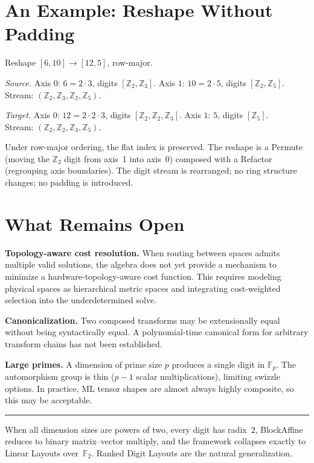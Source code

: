 \documentclass[11pt]{article}
\theoremstyle{definition}
\theoremstyle{remark}
\newcommand{\Z}{\mathbb{Z}}
\newcommand{\F}{\mathbb{F}}
\begin{document}
\section{An Example: Reshape Without Padding}

Reshape $[6, 10] \to [12, 5]$, row-major.

\medskip
\noindent\emph{Source.}\;
Axis $0$: $6 = 2 \cdot 3$, digits $[\Z_2, \Z_3]$.\;
Axis $1$: $10 = 2 \cdot 5$, digits $[\Z_2, \Z_5]$.\\
Stream: $(\Z_2, \Z_3, \Z_2, \Z_5)$.

\medskip
\noindent\emph{Target.}\;
Axis $0$: $12 = 2 \cdot 2 \cdot 3$, digits $[\Z_2, \Z_2, \Z_3]$.\;
Axis $1$: $5$, digits $[\Z_5]$.\\
Stream: $(\Z_2, \Z_2, \Z_3, \Z_5)$.

\medskip
\noindent Under row-major ordering, the flat index is preserved.
The reshape is a Permute (moving the $\Z_2$ digit from axis~1 into axis~0) composed with a Refactor (regrouping axis boundaries).
The digit stream is rearranged; no ring structure changes; no padding is introduced.

\section{What Remains Open}

\textbf{Topology-aware cost resolution.}
When routing between spaces admits multiple valid solutions, the algebra does not yet provide a mechanism to minimize a hardware-topology-aware cost function.
This requires modeling physical spaces as hierarchical metric spaces and integrating cost-weighted selection into the underdetermined solve.

\medskip
\noindent\textbf{Canonicalization.}
Two composed transforms may be extensionally equal without being syntactically equal.
A polynomial-time canonical form for arbitrary transform chains has not been established.

\medskip
\noindent\textbf{Large primes.}
A dimension of prime size $p$ produces a single digit in $\F_p$.
The automorphism group is thin ($p-1$ scalar multiplications), limiting swizzle options.
In practice, ML tensor shapes are almost always highly composite, so this may be acceptable.

\bigskip
\hrule
\bigskip

\noindent When all dimension sizes are powers of two, every digit has radix~$2$, BlockAffine reduces to binary matrix--vector multiply, and the framework collapses exactly to Linear Layouts over~$\F_2$.
Ranked Digit Layouts are the natural generalization.
\end{document}

